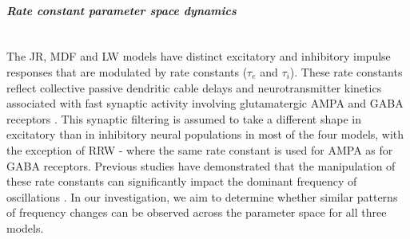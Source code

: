 \documentclass[12pt,twoside]{article}
\begin{document}
\paragraph{\textit{Rate constant parameter space dynamics}} ~\\
The JR, MDF and LW models have distinct excitatory and inhibitory impulse responses that are modulated by rate constants ($\tau_{e}$ and $\tau_{i}$). These rate constants reflect collective passive dendritic cable delays and neurotransmitter kinetics associated with fast synaptic activity involving glutamatergic AMPA and GABA receptors \citep{spiegler2012dynamics}. This synaptic filtering is assumed to take a different shape in excitatory than in inhibitory neural populations in most of the four models, with the exception of RRW - where the same rate constant is used for AMPA as for GABA receptors. Previous studies have demonstrated that the manipulation of these rate constants can significantly impact the dominant frequency of oscillations \citep{david2003neural, gast2019pyrates}. In our investigation, we aim to determine whether similar patterns of frequency changes can be observed across the parameter space for all three models.
\end{document}

